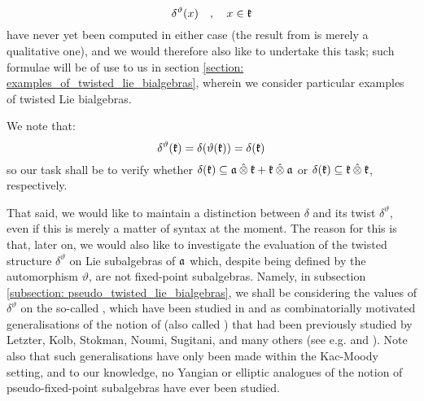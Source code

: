             $$\delta^{\vartheta}(x) \quad, \quad x \in \mathfrak{k}$$
        have never yet been computed in either case (the result from \cite{schrader_integrable_systems_from_classical_reflection_equations} is merely a qualitative one), and we would therefore also like to undertake this task; such formulae will be of use to us in section \ref{section: examples_of_twisted_lie_bialgebras}, wherein we consider particular examples of twisted Lie bialgebras.
        \begin{remark} \label{remark: twisted_cobracket_notation}
            We note that:
                $$\delta^{\vartheta}( \mathfrak{k} ) = \delta( \vartheta( \mathfrak{k} ) ) = \delta( \mathfrak{k} )$$
            so our task shall be to verify whether $\delta(\k) \subseteq \a \hattensor \k + \k \hattensor \a$ or $\delta(\k) \subseteq \k \hattensor \k$, respectively.
            
            That said, we would like to maintain a distinction between $\delta$ and its twist $\delta^{\vartheta}$, even if this is merely a matter of syntax at the moment. The reason for this is that, later on, we would also like to investigate the evaluation of the twisted structure $\delta^{\vartheta}$ on Lie subalgebras of $\mathfrak{a}$ which, despite being defined by the automorphism $\vartheta$, are not fixed-point subalgebras. Namely, in subsection \ref{subsection: pseudo_twisted_lie_bialgebras}, we shall be considering the values of $\delta^{\vartheta}$ on the so-called , which have been studied in \cite{regelskis_vlaar_finite_QSPs_via_generalised_satake_diagrams} and \cite{regelskis_vlaar_kac_moody_pseudo_symmetric_pairs} as combinatorially motivated generalisations of the notion of  (also called ) that had been previously studied by Letzter, Kolb, Stokman, Noumi, Sugitani, and many others (see e.g. \cite{letzter_coideal_subalgebras_and_QSPs} and \cite{kolb_kac_moody_QSPs}). Note also that such generalisations have only been made within the Kac-Moody setting, and to our knowledge, no Yangian or elliptic analogues of the notion of pseudo-fixed-point subalgebras have ever been studied.
        \end{remark}
        
